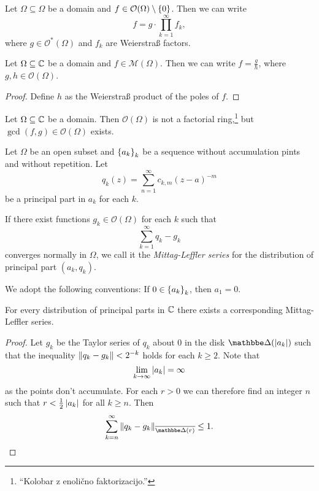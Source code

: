 \begin{izrek}
Let $\Omega \subseteq \Omega$ be a domain and
$f \in \mathcal{O}(\Omega) \setminus \left\{0\right\}$. Then we can write
\[
f = g \cdot \prod_{k=1}^\infty f_k,
\]
where $g \in \mathcal{O}^*(\Omega)$ and $f_k$ are Weierstraß
factors.
\end{izrek}

\obvs

\begin{izrek}
Let $\Omega \subseteq \mathbb{C}$ be a domain and
$f \in \mathcal{M}(\Omega)$. Then we can write $f = \frac{g}{h}$,
where $g, h \in \mathcal{O}(\Omega)$.
\end{izrek}

\begin{proof}
Define $h$ as the Weierstraß product of the poles of $f$.
\end{proof}

\begin{opomba}
Let $\Omega \subseteq \mathbb{C}$ be a domain. Then $\mathcal{O}(\Omega)$
is not a factorial ring,\footnote{``Kolobar z enolično
faktorizacijo.''} but $\gcd(f, g) \in \mathcal{O}(\Omega)$ exists.
\end{opomba}


\begin{definicija}
Let $\Omega$ be an open subset and $\left\{a_k\right\}_k$ be a sequence
without accumulation pints and without repetition. Let
\[
q_k(z) = \sum_{n=1}^\infty c_{k, m} (z - a)^{-m}
\]
be a principal part in $a_k$ for each $k$.

If there exist functions $g_k \in \mathcal{O}(\Omega)$ for each $k$
such that
\[
\sum_{k=1}^\infty q_k - g_k
\]
converges normally in $\Omega$, we call it the
\emph{Mittag-Leffler series} for the
distribution of principal part $(a_k, q_k)$.
\end{definicija}

\begin{opomba}
We adopt the following conventions: If $0 \in \left\{a_k\right\}_k$, then
$a_1 = 0$.
\end{opomba}

\begin{izrek}
\label{inf_prod:thm:MLforC}
For every distribution of principal parts in $\mathbb{C}$ there exists a
corresponding Mittag-Leffler series.
\end{izrek}

\begin{proof}
Let $g_k$ be the Taylor series of $q_k$ about $0$ in the disk
$\dsk(\abs{a_k})$ such that the inequality
$\left\lVert q_k - g_k\right\rVert < 2^{-k}$ holds for each $k \geq 2$. Note that
\[
\lim_{k \to \infty} \left\lvert a_k\right\rvert = \infty
\]
as the points don't accumulate. For each $r > 0$ we can therefore
find an integer $n$ such that $r < \frac{1}{2} \left\lvert a_k\right\rvert$ for all
$k \geq n$. Then
\[
\sum_{k = n}^{\infty} \norm{q_k - g_k}_{\oline{\dsk(r)}} \leq 1.
\qedhere
\]
\end{proof}

